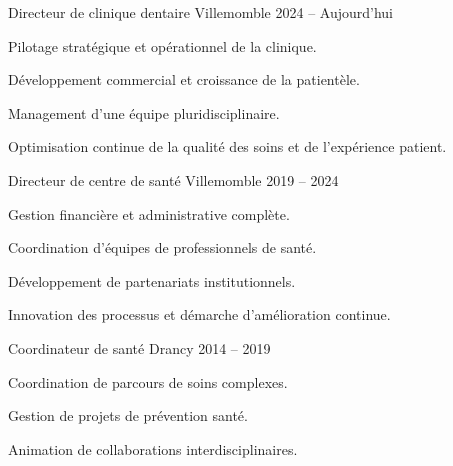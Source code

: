 
\begin{cventries}
  \cventry
    {Directeur de clinique dentaire}
    {Villemomble}
    {}
    {2024 -- Aujourd'hui}
    {
      \begin{cvitems}
        \item Pilotage stratégique et opérationnel de la clinique.
        \item Développement commercial et croissance de la patientèle.
        \item Management d'une équipe pluridisciplinaire.
        \item Optimisation continue de la qualité des soins et de l'expérience patient.
      \end{cvitems}
    }

  \cventry
    {Directeur de centre de santé}
    {Villemomble}
    {}
    {2019 -- 2024}
    {
      \begin{cvitems}
        \item Gestion financière et administrative complète.
        \item Coordination d'équipes de professionnels de santé.
        \item Développement de partenariats institutionnels.
        \item Innovation des processus et démarche d'amélioration continue.
      \end{cvitems}
    }

  \cventry
    {Coordinateur de santé}
    {Drancy}
    {}
    {2014 -- 2019}
    {
      \begin{cvitems}
        \item Coordination de parcours de soins complexes.
        \item Gestion de projets de prévention santé.
        \item Animation de collaborations interdisciplinaires.
      \end{cvitems}
    }
\end{cventries}
